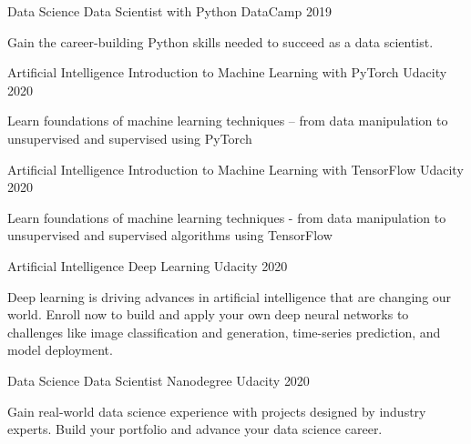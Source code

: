 \begin{cventries}
  \cventry
    {Data Science}
    {Data Scientist with Python}
    {DataCamp}
    {2019}
    {
      \begin{cvitems}
	    {Gain the career-building Python skills needed to succeed as a data scientist. }
      \end{cvitems}
    }
  \cventry
    {Artificial Intelligence}
    {Introduction to Machine Learning with PyTorch}
    {Udacity}
    {2020}
    {
      \begin{cvitems}
        {Learn foundations of machine learning techniques -- from data manipulation to unsupervised and supervised using PyTorch}
      \end{cvitems}
    }
  \cventry
    {Artificial Intelligence}
    {Introduction to Machine Learning with TensorFlow}
    {Udacity}
    {2020}
    {
      \begin{cvitems}
        {Learn foundations of machine learning techniques - from data manipulation to unsupervised and supervised algorithms using TensorFlow}
      \end{cvitems}
    }
  \cventry
    {Artificial Intelligence}
    {Deep Learning}
    {Udacity}
    {2020}
    {
      \begin{cvitems}
        {Deep learning is driving advances in artificial intelligence that are changing our world. Enroll now to build and apply your own deep neural networks to challenges like image classification and generation, time-series prediction, and model deployment.}
      \end{cvitems}
    }
  \cventry
    {Data Science}
    {Data Scientist Nanodegree}
    {Udacity}
    {2020}
    {
      \begin{cvitems}
        {Gain real-world data science experience with projects designed by industry experts. Build your portfolio and advance your data science career.}
      \end{cvitems}
    }
 \vspace{-6mm}
\end{cventries}
